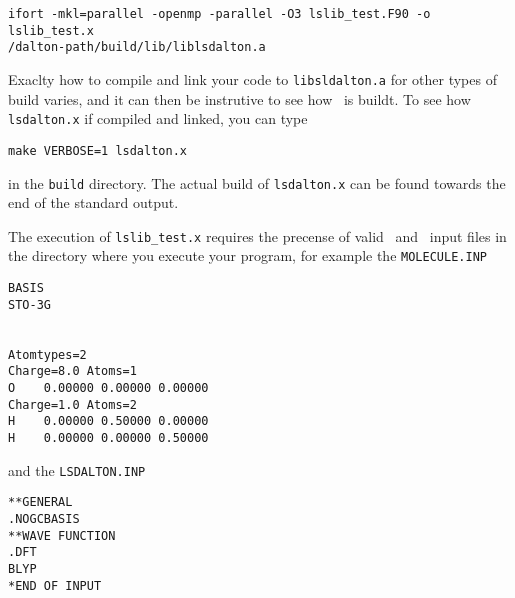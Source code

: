 \begin{verbatim}
ifort -mkl=parallel -openmp -parallel -O3 lslib_test.F90 -o lslib_test.x 
/dalton-path/build/lib/liblsdalton.a
\end{verbatim}
%
Exaclty how to compile and link your code to \verb|libsldalton.a| for other types of build 
varies, and it can then be instrutive to see how \lsdalton\ is buildt. To see how 
\verb|lsdalton.x| if compiled and linked, you can type

\begin{verbatim}
make VERBOSE=1 lsdalton.x
\end{verbatim}
%
in the \verb|build| directory. The actual build of \verb|lsdalton.x| can be found towards
the end of the standard output. 

The execution of \verb|lslib_test.x| requires the precense of  valid \molecule\ and \lsdalton\ input 
files in the directory where you execute your program, for example the \verb|MOLECULE.INP|

\begin{verbatim}
BASIS
STO-3G


Atomtypes=2 
Charge=8.0 Atoms=1
O    0.00000 0.00000 0.00000
Charge=1.0 Atoms=2
H    0.00000 0.50000 0.00000
H    0.00000 0.00000 0.50000
\end{verbatim}
%
and the \verb|LSDALTON.INP|

\begin{verbatim}
**GENERAL
.NOGCBASIS
**WAVE FUNCTION
.DFT
BLYP
*END OF INPUT
\end{verbatim}









